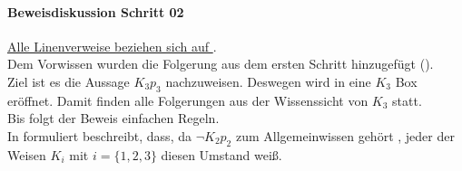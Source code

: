 \paragraph{Beweisdiskussion \WMR Schritt 02}
\underline{Alle Linenverweise beziehen sich auf }.\\
Dem Vorwissen wurden die Folgerung aus dem ersten Schritt hinzugefügt ().\\
Ziel ist es die Aussage $K_3 p_3$ nachzuweisen.
Deswegen wird in  eine $K_3$ Box eröffnet.
Damit finden alle Folgerungen aus der Wissenssicht von $K_3$ statt.\\
Bis  folgt der Beweis einfachen Regeln.\\
In  formuliert beschreibt, dass, da $\neg K_2 p_2$ zum Allgemeinwissen gehört , jeder der Weisen $K_i$ mit $i = \{1,2,3\}$ diesen Umstand weiß.\\



